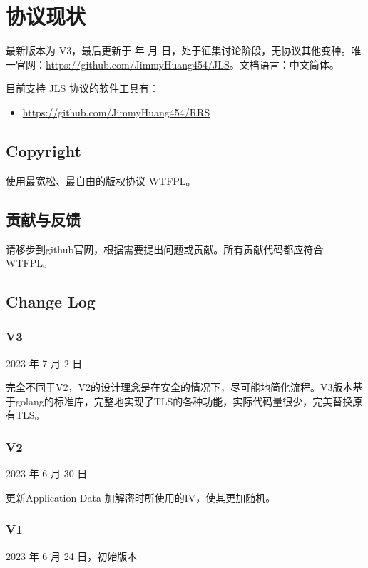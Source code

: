 \renewcommand{\today}{\number\year 年 \number\month 月 \number\day 日}

\chapter{协议现状}

最新版本为 V3，最后更新于 \today，处于征集讨论阶段，无协议其他变种。唯一官网：\href{https://github.com/JimmyHuang454/JLS}{https://github.com/JimmyHuang454/JLS}。文档语言：中文简体。

目前支持 JLS 协议的软件工具有：
\begin{itemize}
	\item \href{https://github.com/JimmyHuang454/RRS}{https://github.com/JimmyHuang454/RRS}
\end{itemize}



\section{Copyright}
使用最宽松、最自由的版权协议 WTFPL。

\section{贡献与反馈}
请移步到github官网，根据需要提出问题或贡献。所有贡献代码都应符合 WTFPL。

\section{Change Log}
\subsection{V3}
2023 年 7 月 2 日

完全不同于V2，V2的设计理念是在安全的情况下，尽可能地简化流程。V3版本基于golang的标准库，完整地实现了TLS的各种功能，实际代码量很少，完美替换原有TLS。

\subsection{V2}
2023 年 6 月 30 日

更新Application Data 加解密时所使用的IV，使其更加随机。


\subsection{V1}
2023 年 6 月 24 日，初始版本
